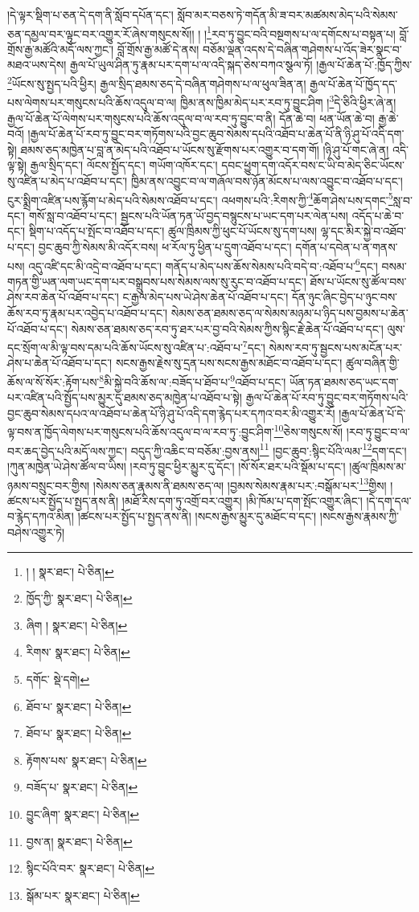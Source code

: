 །དེ་ལྟར་སྡིག་པ་ཅན་དེ་དག་ནི་སློབ་དཔོན་དང་། སློབ་མར་བཅས་ཏེ་གདོན་མི་ཟ་བར་མཚམས་མེད་པའི་སེམས་ཅན་དམྱལ་བར་ལྟུང་བར་འགྱུར་རོ་ཞེས་གསུངས་སོ།། །
།\footnote{། །  སྣར་ཐང་།  པེ་ཅིན། }རབ་ཏུ་བྱུང་བའི་བསྔགས་པ་ལ་དགོངས་པ་བསྟན་པ། བློ་གྲོས་རྒྱ་མཚོའི་མདོ་ལས་ཀྱང་། བློ་གྲོས་རྒྱ་མཚོ་དེ་ནས། བཅོམ་ལྡན་འདས་དེ་བཞིན་གཤེགས་པ་འོད་ཟེར་སྣང་བ་མཐའ་ཡས་དེས། རྒྱལ་པོ་ཡུལ་ཤིན་ཏུ་རྣམ་པར་དག་པ་ལ་འདི་སྐད་ཅེས་བཀའ་སྩལ་ཏོ། །རྒྱལ་པོ་ཆེན་པོ་:ཁྱོད་ཀྱིས་\footnote{ཁྱོད་ཀྱི་  སྣར་ཐང་།  པེ་ཅིན། }ཡོངས་སུ་སྤྱད་པའི་ཕྱིར། རྒྱལ་སྲིད་ཐམས་ཅད་དེ་བཞིན་གཤེགས་པ་ལ་ཕུལ་ཟིན་ན། རྒྱལ་པོ་ཆེན་པོ་ཁྱོད་དད་པས་ལེགས་པར་གསུངས་པའི་ཆོས་འདུལ་བ་ལ། ཁྱིམ་ནས་ཁྱིམ་མེད་པར་རབ་ཏུ་བྱུང་ཤིག །\footnote{ཞིག །  སྣར་ཐང་།  པེ་ཅིན། }དེ་ཅིའི་ཕྱིར་ཞེ་ན། རྒྱལ་པོ་ཆེན་པོ་ལེགས་པར་གསུངས་པའི་ཆོས་འདུལ་བ་ལ་རབ་ཏུ་བྱུང་བ་ནི། དོན་ཆེ་བ། ཕན་ཡོན་ཆེ་བ། རྒྱ་ཆེ་བའོ། །རྒྱལ་པོ་ཆེན་པོ་རབ་ཏུ་བྱུང་བར་གཏོགས་པའི་བྱང་ཆུབ་སེམས་དཔའི་འཐོབ་པ་ཆེན་པོ་ནི་ཉི་ཤུ་པོ་འདི་དག་སྟེ། ཐམས་ཅད་མཁྱེན་པ་བླ་ན་མེད་པའི་འཐོབ་པ་ཡོངས་སུ་རྫོགས་པར་འགྱུར་བ་དག་གོ། །ཉི་ཤུ་པོ་གང་ཞེ་ན། འདི་ལྟ་སྟེ། རྒྱལ་སྲིད་དང་། ལོངས་སྤྱོད་དང་། གཡོག་འཁོར་དང་། དབང་ཕྱུག་དག་འདོར་བས་ང་ཡི་བ་མེད་ཅིང་ཡོངས་སུ་འཛིན་པ་མེད་པ་འཐོབ་པ་དང་། ཁྱིམ་ནས་འབྱུང་བ་ལ་གཞོལ་བས་ཉོན་མོངས་པ་ལས་འབྱུང་བ་འཐོབ་པ་དང་། ངུར་སྨྲིག་འཛིན་པས་རྙོག་པ་མེད་པའི་སེམས་འཐོབ་པ་དང་། འཕགས་པའི་:རིགས་ཀྱི་\footnote{རིགས་  སྣར་ཐང་།  པེ་ཅིན། }ཆོག་ཤེས་པས་དགང་\footnote{དགོང་  སྡེ་དགེ། }སླ་བ་དང་། གསོ་སླ་བ་འཐོབ་པ་དང་། སྦྱངས་པའི་ཡོན་ཏན་ཡོ་བྱད་བསྙུངས་པ་ཡང་དག་པར་ལེན་པས། འདོད་པ་ཆེ་བ་དང་། སྡིག་པ་འདོད་པ་སྤོང་བ་འཐོབ་པ་དང་། ཚུལ་ཁྲིམས་ཀྱི་ཕུང་པོ་ཡོངས་སུ་དག་པས། ལྷ་དང་མིར་སྐྱེ་བ་འཐོབ་པ་དང་། བྱང་ཆུབ་ཀྱི་སེམས་མི་འདོར་བས། ཕ་རོལ་ཏུ་ཕྱིན་པ་དྲུག་འཐོབ་པ་དང་། དགོན་པ་དབེན་པ་ན་གནས་པས། འདུ་འཛི་དང་མི་འདྲེ་བ་འཐོབ་པ་དང་། གནོད་པ་མེད་པས་ཆོས་སེམས་པའི་བདེ་བ་:འཐོབ་པ་\footnote{ཐོབ་པ་  སྣར་ཐང་།  པེ་ཅིན། }དང་། བསམ་གཏན་གྱི་ཡན་ལག་ཡང་དག་པར་བསྒྲུབས་པས་སེམས་ལས་སུ་རུང་བ་འཐོབ་པ་དང་། ཐོས་པ་ཡོངས་སུ་ཚོལ་བས་ཤེས་རབ་ཆེན་པོ་འཐོབ་པ་དང་། ང་རྒྱལ་མེད་པས་ཡེ་ཤེས་ཆེན་པོ་འཐོབ་པ་དང་། དོན་ཉུང་ཞིང་བྱེད་པ་ཉུང་བས་ཆོས་རབ་ཏུ་རྣམ་པར་འབྱེད་པ་འཐོབ་པ་དང་། སེམས་ཅན་ཐམས་ཅད་ལ་སེམས་མཉམ་པ་ཉིད་པས་བྱམས་པ་ཆེན་པོ་འཐོབ་པ་དང་། སེམས་ཅན་ཐམས་ཅད་རབ་ཏུ་ཐར་པར་བྱ་བའི་སེམས་ཀྱིས་སྙིང་རྗེ་ཆེན་པོ་འཐོབ་པ་དང་། ལུས་དང་སྲོག་ལ་མི་ལྟ་བས་དམ་པའི་ཆོས་ཡོངས་སུ་འཛིན་པ་:འཐོབ་པ་\footnote{ཐོབ་པ་  སྣར་ཐང་།  པེ་ཅིན། }དང་། སེམས་རབ་ཏུ་སྦྱངས་པས་མངོན་པར་ཤེས་པ་ཆེན་པོ་འཐོབ་པ་དང་། སངས་རྒྱས་རྗེས་སུ་དྲན་པས་སངས་རྒྱས་མཐོང་བ་འཐོབ་པ་དང་། ཚུལ་བཞིན་གྱི་ཆོས་ལ་སོ་སོར་:རྟོག་པས་\footnote{རྟོགས་པས་  སྣར་ཐང་།  པེ་ཅིན། }མི་སྐྱེ་བའི་ཆོས་ལ་:བཟོད་པ་ཐོབ་པ་\footnote{བཟོད་པ་  སྣར་ཐང་།  པེ་ཅིན། }འཐོབ་པ་དང་། ཡོན་ཏན་ཐམས་ཅད་ཡང་དག་པར་འཛིན་པའི་སྤྱོད་པས་མྱུར་དུ་ཐམས་ཅད་མཁྱེན་པ་འཐོབ་པ་སྟེ། རྒྱལ་པོ་ཆེན་པོ་རབ་ཏུ་བྱུང་བར་གཏོགས་པའི་བྱང་ཆུབ་སེམས་དཔའ་ལ་འཐོབ་པ་ཆེན་པོ་ཉི་ཤུ་པོ་འདི་དག་རྙེད་པར་དཀའ་བར་མི་འགྱུར་རོ། །རྒྱལ་པོ་ཆེན་པོ་དེ་ལྟ་བས་ན་ཁྱོད་ལེགས་པར་གསུངས་པའི་ཆོས་འདུལ་བ་ལ་རབ་ཏུ་:བྱུང་ཤིག་\footnote{བྱུང་ཞིག་  སྣར་ཐང་།  པེ་ཅིན། }ཅེས་གསུངས་སོ། །རབ་ཏུ་བྱུང་བ་ལ་བར་ཆད་བྱེད་པའི་མདོ་ལས་ཀྱང་། བདུད་ཀྱི་འཆིང་བ་བཅོམ་:བྱས་ནས།\footnote{བྱས་ན།  སྣར་ཐང་།  པེ་ཅིན། } །བྱང་ཆུབ་:སྙིང་པོའི་ལམ་\footnote{སྙིང་པོའི་བར་  སྣར་ཐང་།  པེ་ཅིན། }དག་དང་། །ཀུན་མཁྱེན་ཡེ་ཤེས་ཚོལ་བ་ཡིས། །རབ་ཏུ་བྱུང་ཕྱིར་མྱུར་དུ་དོང་། །སོ་སོར་ཐར་པའི་སྡོམ་པ་དང་། །ཚུལ་ཁྲིམས་མ་ཉམས་བསྲུང་བར་གྱིས། །སེམས་ཅན་རྣམས་ནི་ཐམས་ཅད་ལ། །བྱམས་སེམས་རྣམ་པར་:བསྒོམ་པར་\footnote{སྒོམ་པར་  སྣར་ཐང་།  པེ་ཅིན། }གྱིས། །ཚངས་པར་སྤྱོད་པ་སྤྱད་ནས་ནི། །མཐོ་རིས་དག་ཏུ་འགྲོ་བར་འགྱུར། །མི་ཁོམ་པ་དག་སྤོང་འགྱུར་ཞིང་། །དེ་དག་དལ་བ་རྙེད་དཀའ་མིན། །ཚངས་པར་སྤྱོད་པ་སྤྱད་ནས་ནི། །སངས་རྒྱས་མྱུར་དུ་མཐོང་བ་དང་། །སངས་རྒྱས་རྣམས་ཀྱི་བཤེས་འགྱུར་ཏེ། 